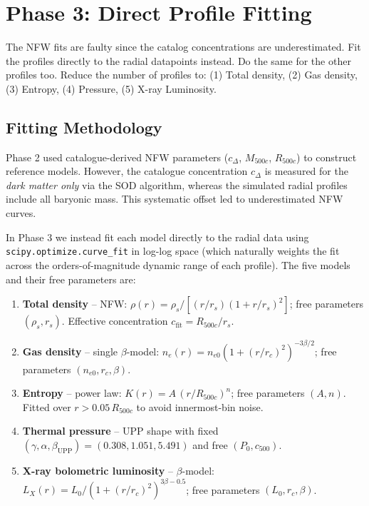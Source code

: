\documentclass[12pt,a4paper]{article}
\begin{document}
\section{Phase 3: Direct Profile Fitting}
\label{sec:phase3}

\begin{querybox}
\textcolor{red!80!black}{%
The NFW fits are faulty since the catalog concentrations are underestimated.
Fit the profiles directly to the radial datapoints instead. Do the same for
the other profiles too. Reduce the number of profiles to:
(1) Total density, (2) Gas density, (3) Entropy, (4) Pressure, (5) X-ray Luminosity.}
\end{querybox}

\subsection{Fitting Methodology}

Phase 2 used catalogue-derived NFW parameters ($c_\Delta$, $M_{500c}$, $R_{500c}$) to
construct reference models. However, the catalogue concentration $c_\Delta$ is measured
for the \emph{dark matter only} via the SOD algorithm, whereas the simulated radial
profiles include all baryonic mass. This systematic offset led to underestimated NFW
curves.

In Phase 3 we instead fit each model directly to the radial data using
\texttt{scipy.optimize.curve\_fit} in log-log space (which naturally weights the fit
across the orders-of-magnitude dynamic range of each profile). The five models and
their free parameters are:

\begin{enumerate}
  \item \textbf{Total density} -- NFW: $\rho(r) = \rho_s / [(r/r_s)(1+r/r_s)^2]$;
        free parameters $(\rho_s, r_s)$. Effective concentration $c_\mathrm{fit} = R_{500c}/r_s$.

  \item \textbf{Gas density} -- single $\beta$-model:
        $n_e(r) = n_{e0}(1+(r/r_c)^2)^{-3\beta/2}$; free parameters $(n_{e0}, r_c, \beta)$.

  \item \textbf{Entropy} -- power law: $K(r) = A\,(r/R_{500c})^n$;
        free parameters $(A, n)$.  Fitted over $r > 0.05\,R_{500c}$ to avoid
        innermost-bin noise.

  \item \textbf{Thermal pressure} -- UPP shape \citep{arnaud2010} with fixed
        $(\gamma, \alpha, \beta_\mathrm{UPP}) = (0.308, 1.051, 5.491)$ and free
        $(P_0, c_{500})$.

  \item \textbf{X-ray bolometric luminosity} -- $\beta$-model:
        $L_X(r) = L_0 / (1+(r/r_c)^2)^{3\beta-0.5}$; free parameters $(L_0, r_c, \beta)$.
\end{enumerate}
\end{document}
